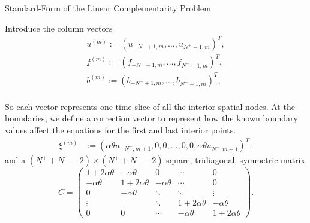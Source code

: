 \documentclass{beamer}
\begin{document}
\begin{frame}{Standard-Form of the Linear Complementarity Problem}

    {\footnotesize \footnotesize
    Introduce the column vectors
    \begin{gather*}
        u^{(m)} := (u_{-N^-+1,m}, \ldots, u_{N^+-1,m})^T, \\
        f^{(m)} := (f_{-N^-+1,m}, \ldots, f_{N^+-1,m})^T,\\
        b^{(m)} := (b_{-N^-+1,m}, \ldots, b_{N^+-1,m})^T,\\
    \end{gather*}
    \vspace{-3em}
    \par  \pause So each vector represents one time slice of all the interior spatial nodes. At the boundaries,
    we define a correction vector to represent how the known boundary 
    values affect the equations for the first and last interior points.
    \begin{align*}
    \xi^{(m)} &:= (\alpha \theta u_{-N^-,m+1}, 0, 0, \ldots, 0, 0, \alpha \theta u_{N^+,m+1})^T,
    \end{align*}
     \pause and a $(N^+ + N^- - 2) \times (N^+ + N^- - 2)$ square, tridiagonal, symmetric matrix
    \[
    C = 
    \begin{pmatrix}
    1 + 2\alpha\theta & -\alpha\theta & 0 & \cdots & 0 \\
    -\alpha\theta & 1 + 2\alpha\theta & -\alpha\theta & \cdots & 0 \\
    0 & -\alpha\theta & \ddots & \ddots & \vdots \\
    \vdots & & \ddots & 1 + 2\alpha\theta & -\alpha\theta \\
    0 & 0 & \cdots & -\alpha\theta & 1 + 2\alpha\theta
    \end{pmatrix}.
    \]

    }
    
    
\end{frame}
\end{document}
